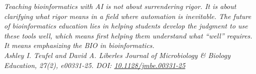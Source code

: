 \null

\vspace*{0.50\textheight}

\begin{flushleft}
\itshape
Teaching bioinformatics with AI is not about surrendering rigor. It is about clarifying what rigor means in a field where automation is inevitable. The future of bioinformatics education lies in helping students develop the judgment to use these tools well, which means first helping them understand what “well” requires. It means emphasizing the BIO in bioinformatics.\\[1.0em]
\upshape
Ashley I. Teufel and David A. Liberles
\textit{Journal of Microbiology \& Biology Education}, 27(2), e00331-25. DOI: 
\href{https://doi.org/10.1128/jmbe.00331-25}{10.1128/jmbe.00331-25}
\end{flushleft}

\restoregeometry
\clearpage